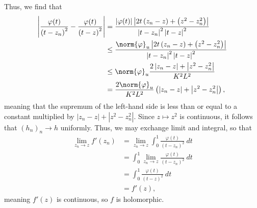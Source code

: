 \documentclass[10pt]{mypackage}
\begin{document}
\begin{solution}
  Thus, we find that
  \begin{align*}
    \left\vert \frac{\varphi(t)}{\left( t-z_n \right)^2} - \frac{\varphi(t)}{\left( t-z \right)^2} \right\vert &= \frac{\left\vert \varphi(t) \right\vert \left\vert 2t\left( z_n-z \right) + \left( z^2-z_n^2 \right) \right\vert}{\left\vert t-z_n \right\vert^2 \left\vert t-z \right\vert^2}\\
                                                                                                               &\leq \frac{\norm{\varphi}_{u} \left\vert 2t\left( z_n-z \right) + \left( z^2-z_n^2 \right) \right\vert}{\left\vert t-z_n \right\vert^2\left\vert t-z \right\vert^2}\\
                                                                                                               &\leq \norm{\varphi}_{u}\frac{2\left\vert z_n-z \right\vert + \left\vert z^2-z_n^2 \right\vert}{K^2L^2}\\
                                                                                                               &= \frac{2\norm{\varphi}_{u}}{K^2L^2} \left( \left\vert z_n- z\right\vert + \left\vert z^2 - z_n^2 \right\vert \right),
  \end{align*}
  meaning that the supremum of the left-hand side is less than or equal to a constant multiplied by $ \left\vert z_n-z \right\vert + \left\vert z^2 - z_n^2 \right\vert $. Since $z\mapsto z^2$ is continuous, it follows that $\left( h_n \right)_n\rightarrow h$ uniformly. Thus, we may exchange limit and integral, so that
  \begin{align*}
    \lim_{z_n\rightarrow z} f'\left(z_n\right) &= \lim_{z_n\rightarrow z}\int_{0}^{1} \frac{\varphi\left( t \right)}{\left( t-z_n \right)^2}\:dt\\
                                               &= \int_{0}^{1} \lim_{z_n\rightarrow z} \frac{\varphi(t)}{\left( t-z_n \right)^2}\:dt\\
                                               &= \int_{0}^{1} \frac{\varphi(t)}{\left( t-z \right)^2}\:dt\\
                                               &= f'(z),
  \end{align*}
  meaning $f'(z)$ is continuous, so $f$ is holomorphic.
\end{solution}
\end{document}
